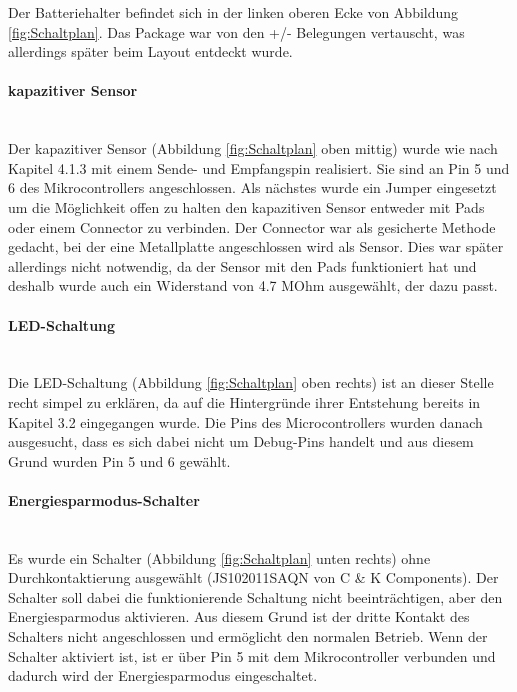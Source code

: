 \documentclass[a4paper,
DIV=13,
12pt,
BCOR=10mm,
department=FakEI,
parskip=half,
automark,
]{article}
\begin{document}
Der Batteriehalter befindet sich in der linken oberen Ecke von Abbildung \ref{fig:Schaltplan}. Das Package war von den +/- Belegungen vertauscht, was allerdings später beim Layout entdeckt wurde.

\paragraph{kapazitiver Sensor} $~$ \\

Der kapazitiver Sensor (Abbildung \ref{fig:Schaltplan} oben mittig) wurde wie nach Kapitel 4.1.3 mit einem Sende- und Empfangspin realisiert. Sie sind an Pin 5 und 6 des Mikrocontrollers angeschlossen. Als nächstes wurde ein Jumper eingesetzt um die Möglichkeit offen zu halten den kapazitiven Sensor entweder mit Pads oder einem Connector zu verbinden. Der Connector war als gesicherte Methode gedacht, bei der eine Metallplatte angeschlossen wird als Sensor. Dies war später allerdings nicht notwendig, da der Sensor mit den Pads funktioniert hat und deshalb wurde auch ein Widerstand von 4.7 MOhm ausgewählt, der dazu passt.

\paragraph{LED-Schaltung} $~$ \\

Die LED-Schaltung (Abbildung \ref{fig:Schaltplan} oben rechts) ist an dieser Stelle recht simpel zu erklären, da auf die Hintergründe ihrer Entstehung bereits in Kapitel 3.2 eingegangen wurde. 
Die Pins des Microcontrollers wurden danach ausgesucht, dass es sich dabei nicht um Debug-Pins handelt und aus diesem Grund wurden Pin 5 und 6 gewählt.

\paragraph{Energiesparmodus-Schalter} $~$ \\

Es wurde ein Schalter (Abbildung \ref{fig:Schaltplan} unten rechts) ohne Durchkontaktierung ausgewählt (JS102011SAQN von C \& K Components). Der Schalter soll dabei die funktionierende Schaltung nicht beeinträchtigen, aber den Energiesparmodus aktivieren. Aus diesem Grund ist der dritte Kontakt des Schalters nicht angeschlossen und ermöglicht den normalen Betrieb. Wenn der Schalter \glqq aktiviert\grqq{} ist, ist er über Pin 5 mit dem Mikrocontroller verbunden und dadurch wird der Energiesparmodus eingeschaltet. 
\end{document}
